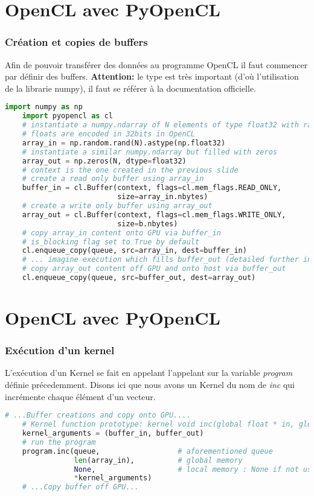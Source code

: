 \documentclass[8pt]{beamer}
\begin{document}
\section{OpenCL avec PyOpenCL}
\begin{frame}[fragile]
    \frametitle{Création et copies de buffers}
    Afin de pouvoir transférer des données au programme OpenCL il faut 
    commencer par définir des buffers. 
    \newline
    \textbf{Attention:} le type est très important (d'où l'utilisation de la 
    librarie numpy), il faut se référer à la documentation officielle.
    \begin{lstlisting}[language=Python]
    import numpy as np
    import pyopencl as cl
    # instantiate a numpy.ndarray of N elements of type float32 with random values
    # floats are encoded in 32bits in OpenCL
    array_in = np.random.rand(N).astype(np.float32)
    # instantiate a similar numpy.ndarray but filled with zeros
    array_out = np.zeros(N, dtype=float32)
    # context is the one created in the previous slide
    # create a read only buffer using array_in
    buffer_in = cl.Buffer(context, flags=cl.mem_flags.READ_ONLY,
                          size=array_in.nbytes)
    # create a write only buffer using array_out
    array_out = cl.Buffer(context, flags=cl.mem_flags.WRITE_ONLY,
                          size=b.nbytes)
    # copy array_in content onto GPU via buffer_in
    # is_blocking flag set to True by default
    cl.enqueue_copy(queue, src=array_in, dest=buffer_in)    
    # ... imagine execution which fills buffer_out (detailed further in the slides) ...
    # copy array_out content off GPU and onto host via buffer_out
    cl.enqueue_copy(queue, src=buffer_out, dest=array_out)
    \end{lstlisting}
\end{frame}

\section{OpenCL avec PyOpenCL}
\begin{frame}[fragile]
    \frametitle{Exécution d'un kernel}
    L'exécution d'un Kernel se fait en appelant l'appelant sur la variable 
    \textit{program} définie précedemment.
    Disons ici que nous avons un Kernel du nom de \textit{inc} qui incrémente 
    chaque élément d'un vecteur.
    \begin{lstlisting}[language=Python]
    # ...Buffer creations and copy onto GPU....
    # Kernel function prototype: kernel void inc(global float * in, global float * out)
    kernel_arguments = (buffer_in, buffer_out)
    # run the program
    program.inc(queue,                  # aforementioned queue
                len(array_in),          # global memory
                None,                   # local memory : None if not used
                *kernel_arguments)
    # ...Copy buffer off GPU...
    \end{lstlisting}
\end{frame}
\end{document}
